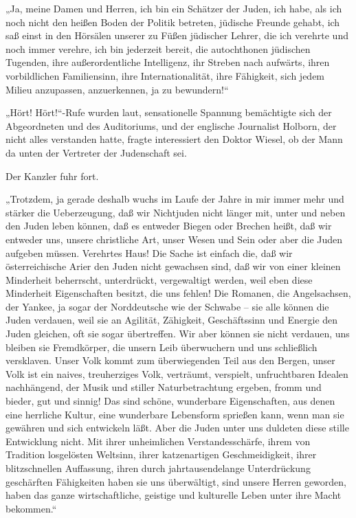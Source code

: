 „Ja, meine Damen und Herren, ich bin ein Schätzer der Juden, ich
habe, als ich noch nicht den heißen Boden der Politik betreten,
jüdische Freunde gehabt, ich saß einst in den Hörsälen unserer
 zu Füßen jüdischer Lehrer, die ich verehrte und
noch immer verehre, ich bin jederzeit bereit, die autochthonen
jüdischen Tugenden, ihre außerordentliche Intelligenz, ihr Streben
nach aufwärts, ihren vorbildlichen Familiensinn, ihre
Internationalität, ihre Fähigkeit, sich jedem Milieu anzupassen,
anzuerkennen, ja zu bewundern!“

„Hört! Hört!“-Rufe wurden laut, sensationelle Spannung bemächtigte
sich der Abgeordneten und des Auditoriums, und der englische
Journalist Holborn, der nicht alles verstanden hatte, fragte
interessiert den Doktor Wiesel, ob der Mann da unten der Vertreter
der Judenschaft sei.

Der Kanzler fuhr fort.

„Trotzdem, ja gerade deshalb wuchs im Laufe der Jahre in mir immer
mehr und stärker die Ueberzeugung, daß wir Nichtjuden nicht länger
mit, unter und neben den Juden leben können, daß es entweder Biegen
oder  Brechen heißt, daß wir entweder uns, unsere
christliche Art, unser Wesen und Sein oder aber die Juden aufgeben
müssen. Verehrtes Haus! Die Sache ist einfach die, daß wir
österreichische Arier den Juden nicht gewachsen sind, daß wir von
einer kleinen Minderheit beherrscht, unterdrückt, vergewaltigt
werden, weil eben diese Minderheit Eigenschaften besitzt, die uns
fehlen! Die Romanen, die Angelsachsen, der Yankee, ja sogar der
Norddeutsche wie der Schwabe – sie alle können die Juden verdauen,
weil sie an Agilität, Zähigkeit, Geschäftssinn und Energie den
Juden gleichen, oft sie sogar übertreffen. Wir aber können sie
nicht verdauen, uns bleiben sie Fremdkörper, die unsern Leib
überwuchern und uns schließlich versklaven. Unser Volk kommt zum
überwiegenden Teil aus den Bergen, unser Volk ist ein naives,
treuherziges Volk, verträumt, verspielt, unfruchtbaren Idealen
nachhängend, der Musik und stiller Naturbetrachtung ergeben, fromm
und bieder, gut und sinnig! Das sind schöne, wunderbare
Eigenschaften, aus denen eine herrliche Kultur, eine wunderbare
Lebensform sprießen kann, wenn man sie gewähren und sich entwickeln
läßt. Aber die Juden unter uns duldeten diese stille Entwicklung
nicht. Mit ihrer unheimlichen Verstandesschärfe, ihrem von
Tradition losgelösten Weltsinn, ihrer katzenartigen
Geschmeidigkeit, ihrer blitzschnellen Auffassung, ihren durch
jahrtausendelange Unterdrückung geschärften Fähigkeiten haben sie
uns überwältigt, sind unsere Herren geworden, haben das ganze
wirtschaftliche, geistige und kulturelle Leben unter ihre Macht
bekommen.“

